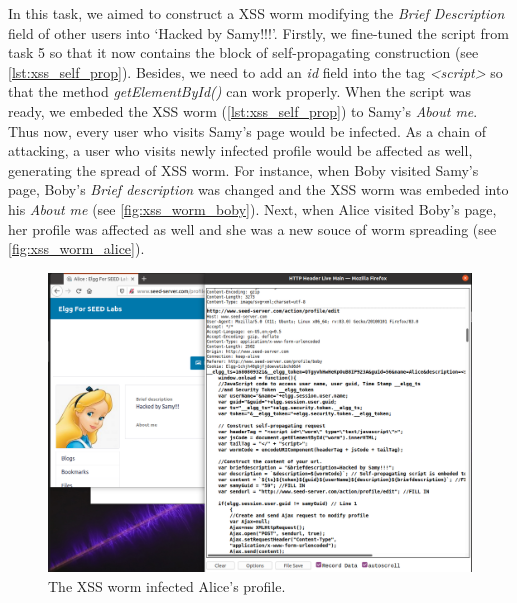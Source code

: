 In this task, we aimed to construct a XSS worm modifying the \emph{Brief Description} field of
other users into `Hacked by Samy!!!'. Firstly, we fine-tuned the script from task 5 so that
it now contains the block of self-propagating construction (see \autoref{lst:xss_self_prop}).
Besides, we need to add an \emph{id} field into the tag \emph{<script>} so that the method
\emph{getElementById()} can work properly. When the script was ready, we embeded the XSS
worm (\autoref{lst:xss_self_prop}) to Samy's \emph{About me}. Thus now, every user who
visits Samy's page would be infected. As a chain of attacking, a user who visits newly infected
profile would be affected as well, generating the spread of XSS worm. For instance, when Boby
visited Samy's page, Boby's \emph{Brief description} was changed and the XSS worm was embeded
into his \emph{About me} (see \autoref{fig:xss_worm_boby}). Next, when Alice visited Boby's
page, her profile was affected as well and she was a new souce of worm spreading (see
\autoref{fig:xss_worm_alice}).

\begin{figure}
    \centering
    \includegraphics[height=\textheight,width=\textwidth,keepaspectratio]
    {figures/XSS_self_prop_alice.png}
    \caption{The XSS worm infected Alice's profile.}
    \label{fig:xss_worm_alice}
\end{figure}